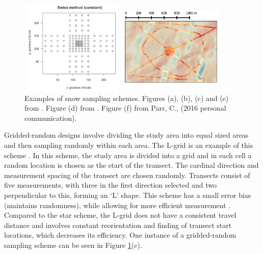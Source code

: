 \documentclass{sfuthesis}
\begin{document}
\begin{figure}[H]
\begin{minipage}[c][11cm][t]{.33\textwidth}
\end{minipage}%
\begin{minipage}[c][11cm][t]{.33\textwidth}
        \vspace*{\fill}
  \centering
    \includegraphics[width=5cm,height=4.5cm]{swiss.png}
   \par\vfill
   \includegraphics[width=5cm,height=4.5cm]{hourglass.png}
\end{minipage}
\caption{Examples of snow sampling schemes. Figures (a), (b), (c) and (e) from \cite{Shea2010}. Figure (d) from \cite{Schweizer2008}. Figure (f) from Parr, C., (2016 personal communication).}
\label{schemes}
\end{figure}

Gridded-random designs involve dividing the study area into equal sized areas and then sampling randomly within each area. The L-grid is an example of this scheme \citep{Bellaire2008, Elder2009, Bellaire2011}. In this scheme, the study area is divided into a grid and in each cell a random location is chosen as the start of the transect. The cardinal direction and measurement spacing of the transect are chosen randomly. Transects consist of five measurements, with three in the first direction selected and two perpendicular to this, forming an `L' shape. This scheme has a small error bias (maintains randomness), while allowing for more efficient measurement \citep{Shea2010}. Compared to the star scheme, the L-grid does not have a consistent travel distance and involves constant reorientation and finding of transect start locations, which decreases its efficiency. One instance of a gridded-random sampling scheme can be seen in Figure \ref{schemes}(c). 
\end{document}
